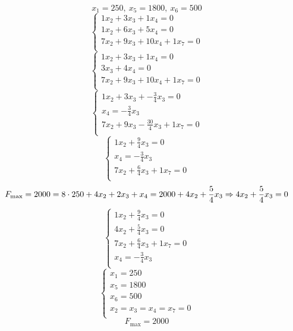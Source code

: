\documentclass[17pt]{extarticle}
\begin{document}
\[
    x_1 = 250, \ x_5 = 1800, \ x_6 = 500
\]
\[
    \begin{cases}
        1x_2 + 3x_3 + 1x_4 = 0         \\
        1x_2 + 6x_3 + 5x_4 = 0         \\
        7x_2 + 9x_3 + 10x_4 + 1x_7 = 0 \\
    \end{cases}
\]
\[
    \begin{cases}
        1x_2 + 3x_3 + 1x_4 = 0         \\
        3x_3 + 4x_4 = 0                \\
        7x_2 + 9x_3 + 10x_4 + 1x_7 = 0 \\
    \end{cases}
\]
\[
    \begin{cases}
        1x_2 + 3x_3 + -\frac{3}{4}x_3 = 0        \\
        x_4 = -\frac{3}{4}x_3                    \\
        7x_2 + 9x_3 - \frac{30}{4}x_3 + 1x_7 = 0 \\
    \end{cases}
\]
\[
    \begin{cases}
        1x_2 + \frac{9}{4}x_3 = 0        \\
        x_4 = -\frac{3}{4}x_3            \\
        7x_2 + \frac{6}{4}x_3 + 1x_7 = 0 \\
    \end{cases}
\]
\[
    F_{\text{max}} = 2000 = 8 \cdot 250 + 4x_2 + 2x_3 + x_4 = 2000 + 4x_2 + \frac{5}{4}x_3 \\
    \Rightarrow 4x_2 + \frac{5}{4}x_3 = 0
\]
\[
    \begin{cases}
        1x_2 + \frac{9}{4}x_3 = 0        \\
        4x_2 + \frac{5}{4}x_3 = 0        \\
        7x_2 + \frac{6}{4}x_3 + 1x_7 = 0 \\
        x_4 = -\frac{3}{4}x_3            \\
    \end{cases}
\]
\[
    \begin{cases}
        x_1 = 250                 \\
        x_5 = 1800                \\
        x_6 = 500                 \\
        x_2 = x_3 = x_4 = x_7 = 0 \\
    \end{cases}
\]
\[
    F_{\text{max}} = 2000
\]
\end{document}
